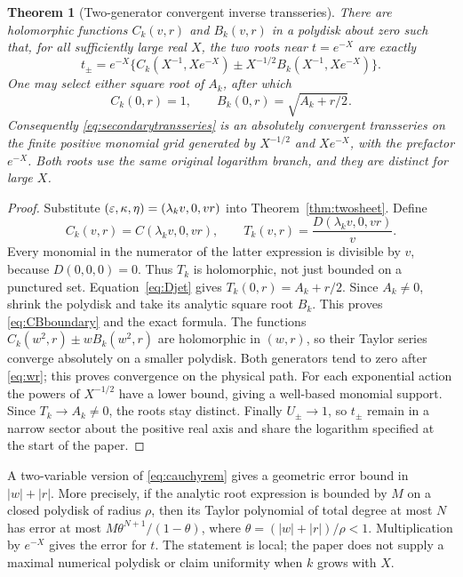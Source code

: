 \documentclass[11pt,a4paper]{article}
\numberwithin{equation}{section}
\newtheorem{theorem}{Theorem}[section]
\theoremstyle{definition}\newtheorem{definition}[theorem]{Definition}
\theoremstyle{remark}\newtheorem{remark}[theorem]{Remark}
\begin{document}
\begin{theorem}[Two-generator convergent inverse transseries]
\label{thm:secondarytransseries}
There are holomorphic functions $C_k(v,r)$ and $B_k(v,r)$ in a polydisk
about zero such that, for all sufficiently large real $X$, the two roots
near $t=e^{-X}$ are exactly
\begin{equation}\label{eq:secondarytransseries}
 t_\pm=e^{-X}\{C_k(X^{-1},Xe^{-X})
               \pm X^{-1/2}B_k(X^{-1},Xe^{-X})\}.
\end{equation}
One may select either square root of $A_k$, after which
\begin{equation}\label{eq:CBboundary}
 C_k(0,r)=1,\qquad B_k(0,r)=\sqrt{A_k+r/2}.
\end{equation}
Consequently \eqref{eq:secondarytransseries} is an absolutely convergent
transseries on the finite positive monomial grid generated by
$X^{-1/2}$ and $Xe^{-X}$, with the prefactor $e^{-X}$. Both roots use the
same original logarithm branch, and they are distinct for large $X$.
\end{theorem}
\begin{proof}
Substitute $(\varepsilon,\kappa,\eta)=(\lambda_kv,0,vr)$ into
Theorem~\ref{thm:twosheet}. Define
\[
 C_k(v,r)=C(\lambda_kv,0,vr),\qquad
 T_k(v,r)=\frac{D(\lambda_kv,0,vr)}v.
\]
Every monomial in the numerator of the latter expression is divisible by
$v$, because $D(0,0,0)=0$. Thus $T_k$ is holomorphic, not just bounded
on a punctured set. Equation~\eqref{eq:Djet} gives
$T_k(0,r)=A_k+r/2$. Since $A_k\ne0$, shrink the polydisk and take its
analytic square root $B_k$. This proves \eqref{eq:CBboundary} and the
exact formula. The functions $C_k(w^2,r)\pm wB_k(w^2,r)$ are holomorphic
in $(w,r)$, so their Taylor series converge absolutely on a smaller
polydisk. Both generators tend to zero after \eqref{eq:wr}; this proves
convergence on the physical path. For each exponential action the powers
of $X^{-1/2}$ have a lower bound, giving a well-based monomial support.
Since $T_k\to A_k\ne0$, the roots stay distinct. Finally $U_\pm\to1$,
so $t_\pm$ remain in a narrow sector about the positive real axis and
share the logarithm specified at the start of the paper.
\end{proof}

A two-variable version of \eqref{eq:cauchyrem} gives a geometric error
bound in $|w|+|r|$. More precisely, if the analytic root expression is
bounded by $M$ on a closed polydisk of radius $\rho$, then its
Taylor polynomial of total degree at most $N$ has error at most
$M\theta^{N+1}/(1-\theta)$, where
$\theta=(|w|+|r|)/\rho<1$. Multiplication by $e^{-X}$ gives the error for
$t$. The statement is local; the paper does not supply a maximal numerical
polydisk or claim uniformity when $k$ grows with $X$.
\end{document}

